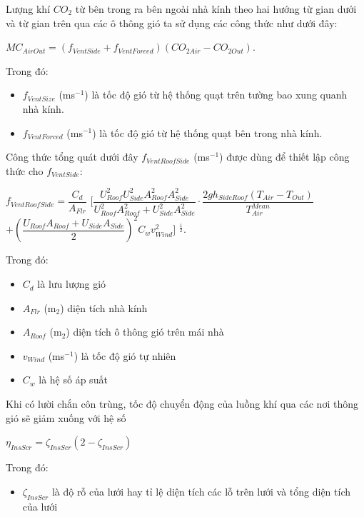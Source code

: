 \documentclass[a4paper]{article}
\begin{document}
	    Lượng khí $CO_2$ từ bên trong ra bên ngoài nhà kính theo hai hướng từ
        gian dưới và từ gian trên qua các ô thông gió ta sử dụng các công thức như dưới đây:
        \begin{center}
            $MC_{AirOut} = (f_{VentSide} + f_{VentForced})(CO_{2Air} - CO_{2Out}).$
        \end{center}
        Trong đó:
        \begin{itemize}
            \item $f_{VentSize}$ (ms$^{-1}$) là tốc độ gió từ hệ thống quạt trên tường bao xung quanh nhà kính.
            \item $f_{VentForced}$ (ms$^{-1}$)  là tốc độ gió từ hệ thống quạt bên trong nhà kính.
        \end{itemize}
    \vspace{5mm}
    Công thức tổng quát dưới đây $f_{VentRoofSide}$ (ms$^{-1}$) được dùng để thiết lập công thức cho $f_{VentSide}$:
    \begin{center}
        $f_{VentRoofSide} = \dfrac{C_d}{A_{Flr}} $
        $\bigg[ \dfrac{U_{Roof}^2U^2_{Side}A_{Roof}^2A^2_{Side}}{U^2_{Roof}A^2_{Roof} + U^2_{Side}A^2_{Side}} \cdot \dfrac{2gh_{SideRoof}(T_{Air} - T_{Out})}{T^{Mean}_{Air}} $\\
        $+ \left( \dfrac{U_{Roof}A_{Roof} + U_{Side}A_{Side}}{2} \right) ^2C_w v^2_{Wind} \bigg]$ $^{\frac{1}{2}}.$\\
        
    \end{center}
    Trong đó:
    \begin{itemize}
        \item $C_{d}$ là lưu lượng gió 
        \item $A_{Flr}$ (m$_2$) diện tích nhà kính
        \item $A_{Roof}$ (m$_2$) diện tích ô thông gió trên mái nhà
        \item $v_{Wind}$ (ms$^{-1}$) là tốc độ gió tự nhiên 
        \item $C_w$ là hệ số áp suất
    \end{itemize}
    
    \vspace{5mm}
    Khi có lười chắn côn trùng, tốc độ chuyển động của luồng khí qua các nơi thông gió sẽ giảm xuống với hệ số
    \begin{center}
        $\eta_{InsScr} = \zeta_{InsScr}(2 - \zeta_{InsScr})$
    \end{center}
    Trong đó:
    \begin{itemize}
        \item $\zeta_{InsScr}$ là độ rỗ của lưới hay tỉ lệ diện tích các lỗ trên lưới và tổng diện tích của lưới
    \end{itemize}
    
\end{document}
